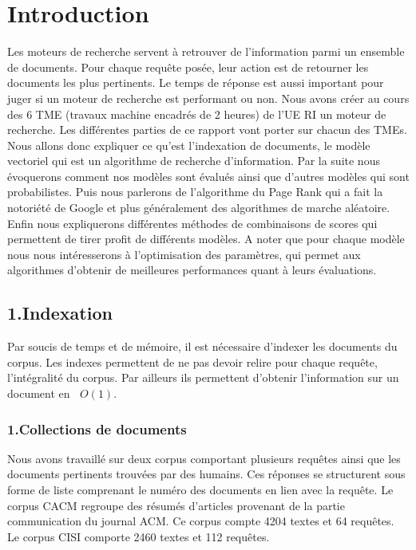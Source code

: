 \documentclass[a4paper,11pt]{report}
\newcommand{\bigO}[1]{\ensuremath{\mathop{}\mathopen{}O\mathopen{}\left(#1\right)}}
\begin{document}
\chapter*{{\centering Introduction}}
Les moteurs de recherche servent à retrouver de l'information parmi un ensemble de documents. Pour chaque requête posée, leur action est de retourner les documents les plus pertinents. Le temps de réponse est aussi important pour juger si un moteur de recherche est performant ou non. Nous avons créer au cours des 6 TME (travaux machine encadrés de 2 heures) de l'UE RI un moteur de recherche. Les différentes parties de ce rapport vont porter sur chacun des TMEs. Nous allons donc expliquer ce qu'est l'indexation de documents, le modèle vectoriel qui est un algorithme de recherche d'information. Par la suite nous évoquerons comment nos modèles sont évalués ainsi que d'autres modèles qui sont probabilistes. Puis nous parlerons de l'algorithme du Page Rank qui a fait la notoriété de Google et plus généralement des algorithmes de marche aléatoire.  Enfin nous expliquerons différentes méthodes de combinaisons de scores qui permettent de tirer profit de différents modèles.
A noter que pour chaque modèle nous nous intéresserons à l'optimisation des paramètres, qui permet aux algorithmes d'obtenir de meilleures performances quant à leurs évaluations.



\section*{1.Indexation}
Par soucis de temps et de mémoire, il est nécessaire d'indexer les documents du corpus. Les indexes permettent de ne pas devoir relire pour chaque requête, l'intégralité du corpus. Par ailleurs ils permettent d'obtenir l'information sur un document en \bigO{1}.
\subsection*{1.Collections de documents}
Nous avons travaillé sur deux corpus comportant plusieurs requêtes ainsi que les documents pertinents trouvées par des humains. Ces réponses se structurent sous forme de liste comprenant le numéro des documents en lien avec la requête. Le corpus CACM regroupe des résumés d'articles provenant de la partie communication du journal ACM. Ce corpus compte 4204 textes et 64 requêtes. Le corpus CISI comporte 2460 textes et 112 requêtes.
\end{document}
